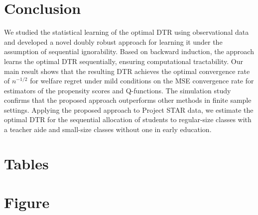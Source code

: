 \section{Conclusion}\label{sec:conclusion}
We studied the statistical learning of the optimal DTR using observational data and developed a novel doubly robust approach for learning it under the assumption of sequential ignorability. Based on backward induction, the approach learns the optimal DTR sequentially, ensuring computational tractability. Our main result shows that the resulting DTR achieves the optimal convergence rate of $n^{-1/2}$ for welfare regret under mild conditions on the MSE convergence rate for estimators of the propensity scores and Q-functions. The simulation study confirms that the proposed approach outperforms other methods in finite sample settings. Applying the proposed approach to Project STAR data, we estimate the optimal DTR for the sequential allocation of students to regular-size classes with a teacher aide and small-size classes without one in early education.




\newpage
\appendix
\section*{Tables}





\bigskip
\bigskip
\bigskip
\newpage
\newpage
\appendix
\section*{Figure}


\medskip

